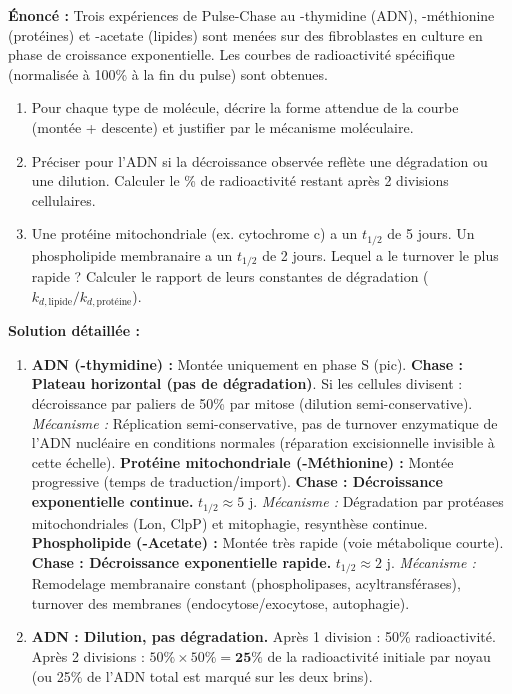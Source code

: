 \documentclass[11pt]{article}
\begin{document}
\begin{exoresolu}
\textbf{Énoncé :} Trois expériences de Pulse-Chase au -thymidine (ADN), -méthionine (protéines) et -acetate (lipides) sont menées sur des fibroblastes en culture en phase de croissance exponentielle. Les courbes de radioactivité spécifique (normalisée à 100\% à la fin du pulse) sont obtenues.
\begin{enumerate}
    \item Pour chaque type de molécule, décrire la forme attendue de la courbe (montée + descente) et justifier par le mécanisme moléculaire.
    \item Préciser pour l'ADN si la décroissance observée reflète une dégradation ou une dilution. Calculer le \% de radioactivité restant après 2 divisions cellulaires.
    \item Une protéine mitochondriale (ex. cytochrome c) a un $t_{1/2}$ de 5 jours. Un phospholipide membranaire a un $t_{1/2}$ de 2 jours. Lequel a le turnover le plus rapide ? Calculer le rapport de leurs constantes de dégradation ($k_{d,\text{lipide}} / k_{d,\text{protéine}}$).
\end{enumerate}
\tcblower
\textbf{Solution détaillée :}
\begin{enumerate}
    \item \textbf{ADN (-thymidine) :} Montée uniquement en phase S (pic). \textbf{Chase : Plateau horizontal (pas de dégradation)}. Si les cellules divisent : décroissance par paliers de 50\% par mitose (dilution semi-conservative). \emph{Mécanisme :} Réplication semi-conservative, pas de turnover enzymatique de l'ADN nucléaire en conditions normales (réparation excisionnelle invisible à cette échelle).
    \textbf{Protéine mitochondriale (-Méthionine) :} Montée progressive (temps de traduction/import). \textbf{Chase : Décroissance exponentielle continue.} $t_{1/2} \approx 5$ j. \emph{Mécanisme :} Dégradation par protéases mitochondriales (Lon, ClpP) et mitophagie, resynthèse continue.
    \textbf{Phospholipide (-Acetate) :} Montée très rapide (voie métabolique courte). \textbf{Chase : Décroissance exponentielle rapide.} $t_{1/2} \approx 2$ j. \emph{Mécanisme :} Remodelage membranaire constant (phospholipases, acyltransférases), turnover des membranes (endocytose/exocytose, autophagie).
    \item \textbf{ADN : Dilution, pas dégradation.} Après 1 division : 50\% radioactivité. Après 2 divisions : $50\% \times 50\% = \textbf{25\%}$ de la radioactivité initiale par noyau (ou 25\% de l'ADN total est marqué sur les deux brins).

\end{enumerate}
\end{exoresolu}
\end{document}
